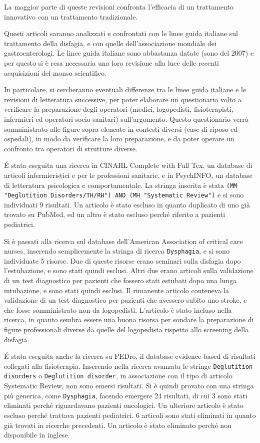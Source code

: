 La maggior parte di queste revisioni confronta l'efficacia di un trattamento 
innovativo con un trattamento tradizionale.

Questi articoli saranno analizzati e confrontati con le linee guida italiane 
sul trattamento della disfagia, e con quelle dell'associazione mondiale dei 
gastroenterologi.
Le linee guida italiane sono abbastanza datate (sono del 2007) e per questo si 
è resa necessaria una loro revisione alla luce delle recenti acquisizioni del 
monso scientifico.

In particolare, si cercheranno eventuali differenze tra le linee guida italiane 
e le revisioni di letteratura successive, per poter elaborare un questionario 
volto a verificare la preparazione degli operatori (medici, logopedisti, 
fisioterapisti, infermieri ed operatori socio sanitari) sull'argomento.
Questo questionario verrà somministrato alle figure sopra elencate in contesti 
diversi (case di riposo ed ospedali), in modo da verificare la loro 
preparazione, e da poter operare un confronto tra operatori di strutture 
diverse.

\'E stata eseguita una ricerca in CINAHL Complete with Full Tex, un database di 
articoli infermieristici e per le professioni sanitarie, e in PsychINFO, un 
database di letteratura psicologica e comportamentale.
La stringa inserita è stata \texttt{(MM "Deglutition Disorders/TH/RH") AND (MH 
"Systematic Review")} e si sono individuati 9 risultati.
Un articolo è stato escluso in quanto duplicato di uno già trovato su PubMed, 
ed un altro è stato escluso perché riferito a pazienti pediatrici.

Si è passati alla ricerca sul database dell'American Association of critical 
care nurses, inserendo semplicemente la stringa di ricerca \texttt{Dysphagia}, 
e si sono individuate 5 risorse.
Due di queste risorse erano seminari sulla disfagia dopo l'estubazione, e sono 
stati quindi esclusi.
Altri due erano articoli sulla validazione di un test diagnostico per pazienti 
che fossero stati estubati dopo una lunga intubazione, e sono stati quindi 
esclusi.
Il rimanente articolo conteneva la validazione di un test diagnostico per 
pazienti che avessero subito uno stroke, e che fosse somministrato non da 
logopedisti.
L'articolo è stato incluso nella ricerca, in quanto sembra essere una buona 
risorsa per sondare la preparazione di figure professionali diverse da quelle 
del logopedista rispetto allo screening della disfagia.

\'E stata eseguita anche la ricerca su PEDro, il database evidence-based di 
risultati collegati alla fisioterapia.
Inserendo nella ricerca avanzata le stringe \texttt{Deglutition disorders} o 
\texttt{Deglutition disorder}, in associazione con il tipo di articolo 
Systematic Review, non sono emersi risultati.
Si è quindi provato con una stringa più generica, come \texttt{Dysphagia}, 
facendo emergere 24 risultati, di cui 3 sono stati eliminati perché 
riguardavano pazienti oncologici.
Un ulteriore articolo è stato escluso perché trattava pazienti pediatrici.
6 articoli sono stati eliminati in quanto già trovati in ricerche precedenti.
Un articolo è stato eliminato perché non disponibile in inglese.

